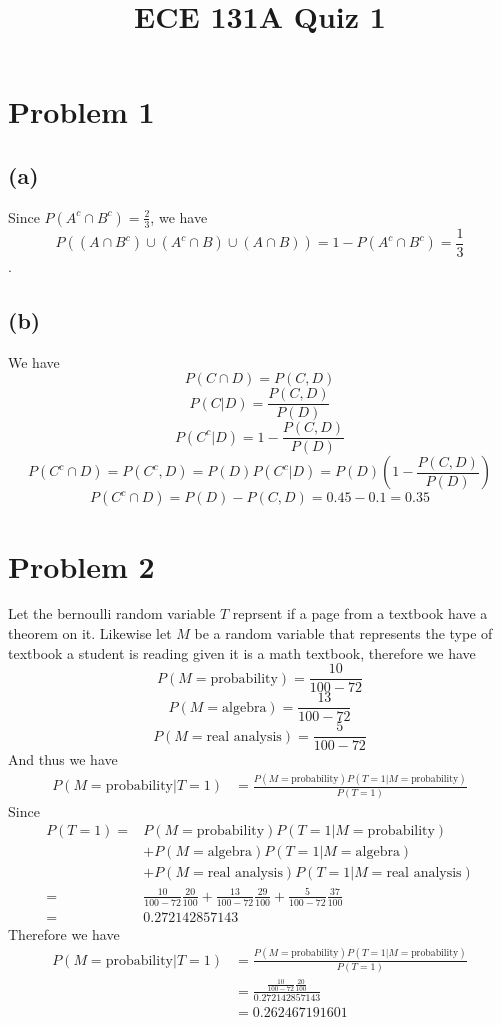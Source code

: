 
\title{ECE 131A Quiz 1}

\maketitle
\section*{Problem 1}
\subsection*{(a)}
Since $P(A^c\cap B^c)=\frac{2}{3}$, we have 
$$P((A\cap B^c)\cup (A^c\cap B)\cup (A\cap B))=1-P(A^c\cap B^c)=\boxed{\frac{1}{3}}$$.
\subsection*{(b)}
We have
$$P(C\cap D )=P(C,D)$$
$$P(C|D)=\frac{P(C,D)}{P(D)}$$
$$P(C^c|D)=1-\frac{P(C,D)}{P(D)}$$
$$P(C^c\cap D )=P(C^c,D)=P(D)P(C^c|D)=P(D)(1-\frac{P(C,D)}{P(D)})$$
$$P(C^c\cap D )=P(D)-P(C,D)=0.45-0.1=\boxed{0.35}$$
\section*{Problem 2}
Let the bernoulli random variable $T$ reprsent if a page from a 
textbook have a theorem on it. Likewise let $M$ be a  random variable that represents the type of 
textbook a student is reading given it is a math textbook, therefore we have
$$P(M=\text{probability})=\frac{10}{100-72}$$
$$P(M=\text{algebra})=\frac{13}{100-72}$$
$$P(M=\text{real analysis})=\frac{5}{100-72}$$
And thus we have
\begin{align*}
P(M=\text{probability}|T=1)&=\frac{P(M=\text{probability})P(T=1|M=\text{probability})}{P(T=1)}
\end{align*}
Since
\begin{align*}
    P(T=1)=&P(M=\text{probability})P(T=1|M=\text{probability})
\\&+P(M=\text{algebra})P(T=1|M=\text{algebra})\\&+
P(M=\text{real analysis})P(T=1|M=\text{real analysis})\\
=&\frac{10}{100-72}\frac{20}{100}+\frac{13}{100-72}\frac{29}{100}+\frac{5}{100-72}\frac{37}{100}\\
=&0.272142857143
\end{align*}
Therefore we have
\begin{align*}
    P(M=\text{probability}|T=1)&=\frac{P(M=\text{probability})P(T=1|M=\text{probability})}{P(T=1)}\\
    &=\frac{\frac{10}{100-72}\frac{20}{100}}{0.272142857143}\\
    &=\boxed{0.262467191601}
    \end{align*}
